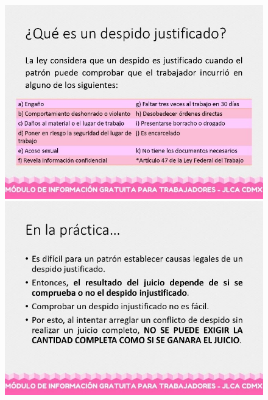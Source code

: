 \begin{figure}[H] 
  \centering
  \begin{minipage}[b]{0.45\textwidth}
    \includegraphics[width=\textwidth]{Figures/A2_3.jpg}
  \end{minipage}
  \begin{minipage}[b]{0.45\textwidth}
    \includegraphics[width=\textwidth]{Figures/A2_4.jpg}
  \end{minipage}
  \label{fig:A2_3_2}
\end{figure}
